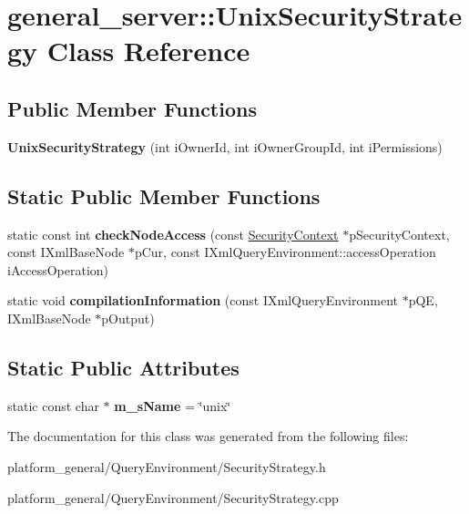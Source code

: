 \hypertarget{classgeneral__server_1_1UnixSecurityStrategy}{\section{general\-\_\-server\-:\-:\-Unix\-Security\-Strategy \-Class \-Reference}
\label{classgeneral__server_1_1UnixSecurityStrategy}
}
\subsection*{\-Public \-Member \-Functions}
\begin{DoxyCompactItemize}
\item 
\hypertarget{classgeneral__server_1_1UnixSecurityStrategy_a8546f0ddb203f443910549b21e8d30a8}{{\bfseries \-Unix\-Security\-Strategy} (int i\-Owner\-Id, int i\-Owner\-Group\-Id, int i\-Permissions)}\label{classgeneral__server_1_1UnixSecurityStrategy_a8546f0ddb203f443910549b21e8d30a8}

\end{DoxyCompactItemize}
\subsection*{\-Static \-Public \-Member \-Functions}
\begin{DoxyCompactItemize}
\item 
\hypertarget{classgeneral__server_1_1UnixSecurityStrategy_ac49bb24b67c28dadf15920746250f6db}{static const int {\bfseries check\-Node\-Access} (const \hyperlink{classgeneral__server_1_1SecurityContext}{\-Security\-Context} $\ast$p\-Security\-Context, const \-I\-Xml\-Base\-Node $\ast$p\-Cur, const \-I\-Xml\-Query\-Environment\-::access\-Operation i\-Access\-Operation)}\label{classgeneral__server_1_1UnixSecurityStrategy_ac49bb24b67c28dadf15920746250f6db}

\item 
\hypertarget{classgeneral__server_1_1UnixSecurityStrategy_a316e6e4df03fd238d288e4823803c05c}{static void {\bfseries compilation\-Information} (const \-I\-Xml\-Query\-Environment $\ast$p\-Q\-E, \-I\-Xml\-Base\-Node $\ast$p\-Output)}\label{classgeneral__server_1_1UnixSecurityStrategy_a316e6e4df03fd238d288e4823803c05c}

\end{DoxyCompactItemize}
\subsection*{\-Static \-Public \-Attributes}
\begin{DoxyCompactItemize}
\item 
\hypertarget{classgeneral__server_1_1UnixSecurityStrategy_ac71d09a19f94b35286ca4dce492bc8c8}{static const char $\ast$ {\bfseries m\-\_\-s\-Name} = \char`\"{}unix\char`\"{}}\label{classgeneral__server_1_1UnixSecurityStrategy_ac71d09a19f94b35286ca4dce492bc8c8}

\end{DoxyCompactItemize}


\-The documentation for this class was generated from the following files\-:\begin{DoxyCompactItemize}
\item 
platform\-\_\-general/\-Query\-Environment/\-Security\-Strategy.\-h\item 
platform\-\_\-general/\-Query\-Environment/\-Security\-Strategy.\-cpp\end{DoxyCompactItemize}
